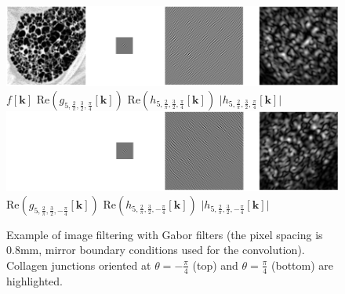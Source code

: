 \documentclass[fleqn,a4paper,oneside,openany]{book}
\begin{document}
\begin{figure}
\centering
\includegraphics[trim = 0 0 0 0, clip, width=\linewidth]{Gabor_example.png}\\
\hspace{.5cm}
$f[\boldsymbol{k}]$
\hspace{1.6cm}
$\text{Re}\left(g_{5,\frac{2}{\pi},\frac{3}{2},\frac{\pi}{4}}[\boldsymbol{k}]\right)$
\hspace{.8cm}
$\text{Re}\left(h_{5,\frac{2}{\pi},\frac{3}{2},\frac{\pi}{4}}[\boldsymbol{k}]\right)$
\hspace{1.6cm}
$\lvert h_{5,\frac{2}{\pi},\frac{3}{2},\frac{\pi}{4}}[\boldsymbol{k}]\rvert$\\
\vspace{.3cm}
\includegraphics[trim = 0 0 0 0, clip, width=\linewidth]{Gabor_example2.png}\\
\hspace{.5cm}
\phantom{$f[\boldsymbol{k}]$}
\hspace{1.6cm}
$\text{Re}\left(g_{5,\frac{2}{\pi},\frac{3}{2},-\frac{\pi}{4}}[\boldsymbol{k}]\right)$
\hspace{.7cm}
$\text{Re}\left(h_{5,\frac{2}{\pi},\frac{3}{2},-\frac{\pi}{4}}[\boldsymbol{k}]\right)$
\hspace{1.5cm}
$\lvert h_{5,\frac{2}{\pi},\frac{3}{2},-\frac{\pi}{4}}[\boldsymbol{k}]\rvert$
\caption{Example of image filtering with Gabor filters (the pixel spacing is 0.8mm, mirror boundary conditions used for the convolution).
Collagen junctions oriented at $\theta=-\frac{\pi}{4}$ (top) and $\theta=\frac{\pi}{4}$ (bottom) are highlighted.
}
  \label{fig:Gabor_example}
\end{figure}
%
\end{document}
